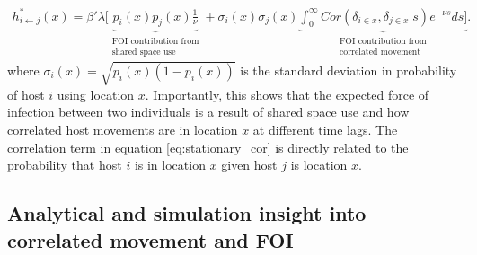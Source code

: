 \documentclass[letterpaper]{article}
\begin{document}
\begin{equation}
    \begin{aligned}
    h^*_{i \leftarrow j}(x) = \beta' \lambda [ \underbrace{p_i(x)p_j(x) \frac{1}{\nu}}_{\substack{\text{FOI contribution from} \\ \text{shared space use}}} + \sigma_i(x) \sigma_j(x) \underbrace{\int_{0}^{\infty} Cor(\delta_{i \in x}, \delta_{j \in x} | s) e^{-\nu s} ds]}_{\substack{\text{FOI contribution from} \\ \text{correlated movement}}}.
    \end{aligned}
    \label{eq:stationary_cor}
\end{equation}
where $\sigma_i(x) = \sqrt{p_i(x)(1 - p_i(x))}$  is the standard deviation in probability of host $i$ using location $x$.  Importantly, this shows that the expected force of infection between two individuals is a result of shared space use and how correlated host movements are in location $x$ at different time lags.  The correlation term in equation \ref{eq:stationary_cor} is directly related to the probability that host $i$ is in location $x$ given host $j$ is location $x$. 

\subsection*{Analytical and simulation insight into correlated movement and FOI}
\end{document}
